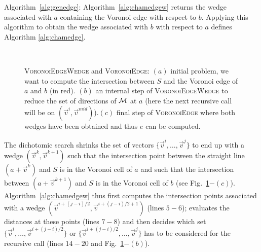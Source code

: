 \documentclass{llncs}
\begin{document}
Algorithm~\ref{alg:genedge}: Algorithm~\ref{alg:chamedgew} returns the
wedge associated with $a$ containing the Voronoi edge with respect to
$b$. Applying this algorithm to obtain the wedge associated with $b$ with respect to
$a$ defines  Algorithm \ref{alg:chamedge}.
\begin{figure}[h]
  \begin{center}\scriptsize
    ~~~~~~~~~
    ~~~~~~~~~
  \end{center}
  \caption{\small \textsc{VoronoiEdgeWedge} and \textsc{VoronoiEdge}: $(a)$
    initial problem, we want to compute the intersection between $S$
    and the Voronoi edge of $a$ and $b$ (in red). $(b)$ an internal step of
    \textsc{VoronoiEdgeWedge} to reduce the set of directions of $\mathcal{M}$
    at $a$ (here the next recursive call will be on
    $(\vec{v}^i,\vec{v}^{mid})$).$(c)$ final step of
    \textsc{VoronoiEdge} where both wedges have been obtained and thus
    $e$ can be computed.}
  \label{fig:algo}
\end{figure}
The dichotomic search shrinks the set of vectors
$\{\vec{v}^i,\ldots,\vec{v}^j\}$ to end up with a wedge
$(\vec{v}^k,\vec{v}^{k+1})$ such that the intersection point between
the straight line $(a + \vec{v}^k)$ and $S$ is in the Voronoi cell of
$a$ and such that the intersection between $(a + \vec{v}^{k+1})$ and $S$
is in the Voronoi cell of $b$ (see
Fig.~\ref{fig:algo}$-(c)$). Algorithm~\ref{alg:chamedgew} thus first
computes the intersection points associated with a wedge
$(\vec{v}^{i+(j-i)/2}, \vec{v}^{i+(j-i)/2+1})$ (lines $5-6$);
evaluates the distances at these points (lines $7-8$) and then decides
which set $\{\vec{v}^i,\ldots,\vec{v}^{i+(j-i)/2}\}$ or
$\{\vec{v}^{i+(j-i)/2},\ldots,\vec{v}^j\}$ has to be considered for
the recursive call (lines $14-20$ and Fig.~\ref{fig:algo}$-(b)$).
\end{document}
